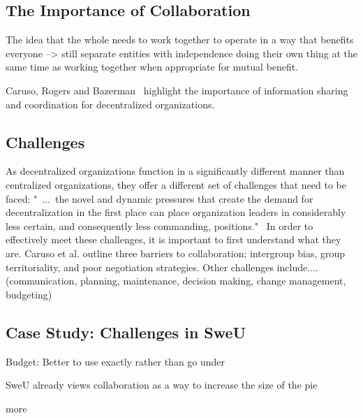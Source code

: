 \subsection{The Importance of Collaboration}
The idea that the whole needs to work together to operate in a way that benefits everyone --> still separate entities with independence doing their own thing at the same time as working together when appropriate for mutual benefit.

Caruso, Rogers and Bazerman~\cite{caruso2008boundaries} highlight the importance of information sharing and coordination for decentralized organizations. 
        
\subsection{Challenges}
As decentralized organizations function in a significantly different manner than centralized organizations, they offer a different set of challenges that need to be faced: "~...~the novel and dynamic pressures that create the demand for decentralization in the first place can place organization leaders in considerably less certain, and consequently less commanding, positions."~\cite{caruso2008boundaries} In order to effectively meet these challenges, it is important to first understand what they are. Caruso et al. outline three barriers to collaboration; intergroup bias, group territoriality, and poor negotiation  strategies. Other challenges include.... (communication, planning, maintenance, decision making, change management, budgeting)

\subsection{Case Study: Challenges in SweU}

Budget: Better to use exactly rather than go under

SweU already views collaboration as a way to increase the size of the pie

more